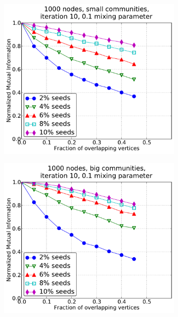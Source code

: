 %
\begin{figure}[h!]
    \centering
    \begin{subfigure}{0.5\textwidth}
    \centering
    \includegraphics[width=\appplotwidth]{plots/overlap_iter_1mu_a.pdf}
    \end{subfigure}%
    \begin{subfigure}{0.5\textwidth}
    \centering
    \includegraphics[width=\appplotwidth]{plots/overlap_iter_1mu_b.pdf}

\end{subfigure}
\end{figure}
